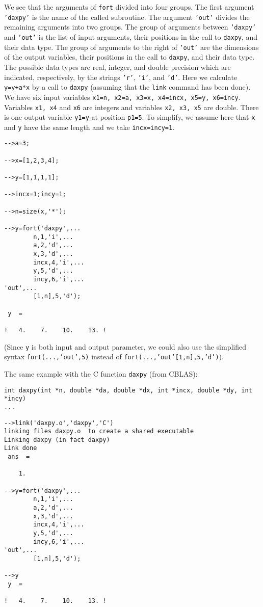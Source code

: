We see that the arguments of {\tt fort}  divided into four groups.
The first argument {\tt 'daxpy'} is the name of the called subroutine.
The argument {\tt 'out'} divides the remaining arguments into two 
groups.  The group of arguments between {\tt 'daxpy'} and {\tt 'out'}
is the list of input arguments, their positions in the call to {\tt daxpy},
and their data type.  The group of arguments to the right of {\tt 'out'}
are the dimensions of the output variables, their positions in the call
to {\tt daxpy}, and their data type.
The possible data types are real, integer, and double precision which
are indicated, respectively, by the strings {\tt 'r'}, {\tt 'i'}, and
{\tt 'd'}.  
Here we calculate {\tt y=y+a*x} by a call to {\tt daxpy} (assuming
that the {\tt link} command has been done).
We have six input variables 
{\tt x1=n, x2=a, x3=x, x4=incx, x5=y, x6=incy}.
Variables {\tt x1, x4} and {\tt x6} are integers and variables
{\tt x2, x3, x5} are double. There is one output variable {\tt y1=y}
at position {\tt p1=5}. To simplify, we assume here that {\tt x} and
{\tt y} have the same length and we take {\tt incx=incy=1}.
\begin{verbatim}
-->a=3;
 
-->x=[1,2,3,4];
 
-->y=[1,1,1,1];
 
-->incx=1;incy=1;

-->n=size(x,'*');

-->y=fort('daxpy',...
        n,1,'i',...
        a,2,'d',...
        x,3,'d',...
        incx,4,'i',...
        y,5,'d',...
        incy,6,'i',...
'out',...
        [1,n],5,'d');

 y  =
 
!   4.    7.    10.    13. !

\end{verbatim}
(Since {\tt y} is both input and output parameter, we could also use
the simplified syntax 
{\tt fort(...,'out',5)} instead of {\tt fort(...,'out'[1,n],5,'d')}). 

The same example with the C function {\tt daxpy} (from CBLAS):
\begin{verbatim}
int daxpy(int *n, double *da, double *dx, int *incx, double *dy, int *incy)
...
\end{verbatim}

\begin{verbatim}
-->link('daxpy.o','daxpy','C')
linking files daxpy.o  to create a shared executable
Linking daxpy (in fact daxpy)
Link done
 ans  =
 
    1.  

-->y=fort('daxpy',...
        n,1,'i',...
        a,2,'d',...
        x,3,'d',...
        incx,4,'i',...
        y,5,'d',...
        incy,6,'i',...
'out',...
        [1,n],5,'d');
 
-->y
 y  =
 
!   4.    7.    10.    13. !
\end{verbatim}

